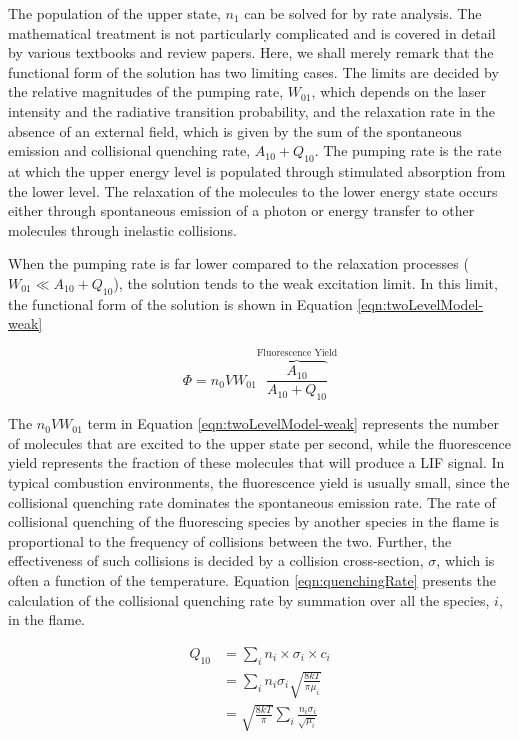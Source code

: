 The population of the upper state, \(n_1\) can be solved for by rate analysis.
The mathematical treatment is not particularly complicated and is covered in detail by various textbooks and review papers.\cite{1996-eckbreth,1997-daily}
Here, we shall merely remark that the functional form of the solution has two limiting cases.
The limits are decided by the relative magnitudes of the pumping rate, \(W_{01}\), which depends on the laser intensity and the radiative transition probability, and the relaxation rate in the absence of an external field, which is given by the sum of the spontaneous emission and collisional quenching rate, \(A_{10} + Q_{10}\).
The pumping rate is the rate at which the upper energy level is populated through stimulated absorption from the lower level.
The relaxation of the molecules to the lower energy state occurs either through spontaneous emission of a photon or energy transfer to other molecules through inelastic collisions.

When the pumping rate is far lower compared to the relaxation processes (\(W_{01} \ll A_{10} + Q_{10}\)), the solution tends to the weak excitation limit.
In this limit, the functional form of the solution is shown in Equation \ref{eqn:twoLevelModel-weak}

\begin{equation}
  \Phi = n_0 V W_{01}\overbrace{\frac{A_{10}}{A_{10}+Q_{10}}}^{\text{Fluorescence Yield}}
  \label{eqn:twoLevelModel-weak}
\end{equation}

The \(n_0VW_{01}\) term in Equation \ref{eqn:twoLevelModel-weak} represents the number of molecules that are excited to the upper state per second, while the fluorescence yield represents the fraction of these molecules that will produce a LIF signal.
In typical combustion environments, the fluorescence yield is usually small, since the collisional quenching rate dominates the spontaneous emission rate.
The rate of collisional quenching of the fluorescing species by another species in the flame is proportional to the frequency of collisions between the two.
Further, the effectiveness of such collisions is decided by a collision cross-section, \(\sigma\), which is often a function of the temperature.
Equation \ref{eqn:quenchingRate} presents the calculation of the collisional quenching rate by summation over all the species, \(i\), in the flame.

\begin{align}
  Q_{10} &= \sum_i n_i \times \sigma_i \times c_i \nonumber \\
  & = \sum_i n_i \sigma_i \sqrt{\frac{8kT}{\pi\mu_i}} \nonumber \\
  & = \sqrt{\frac{8kT}{\pi}} \sum_i \frac{n_i \sigma_i}{\sqrt{\mu_i}}
  \label{eqn:quenchingRate}
\end{align}

